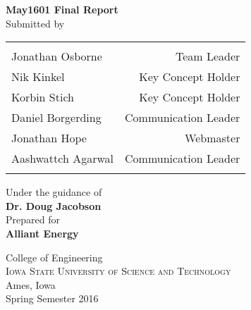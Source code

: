 \begin{titlepage}

\begin{center}

\Huge \textbf {May1601 Final Report}\\[0.5in]

\normalsize Submitted by \\
\begin{table}[h]
\centering
\begin{tabular}{lr}\hline \\
Jonathan Osborne & Team Leader \\
Nik Kinkel & Key Concept Holder \\ 
Korbin Stich & Key Concept Holder \\ 
Daniel Borgerding & Communication Leader \\
Jonathan Hope & Webmaster \\
Aashwattch Agarwal & Communication Leader \\
\\ \hline
\end{tabular}
\end{table}

\vspace{.1in}
Under the guidance of\\
{\textbf{Dr. Doug Jacobson}}\\[0.2in]

\vspace{.1in}
Prepared for\\
{\textbf{Alliant Energy}}\\[0.2in]

\vfill

\Large{College of Engineering}\\
\normalsize
\textsc{Iowa State University of Science and Technology}\\
Ames, Iowa \\
\vspace{0.2cm}
Spring Semester 2016

\end{center}

\end{titlepage}

